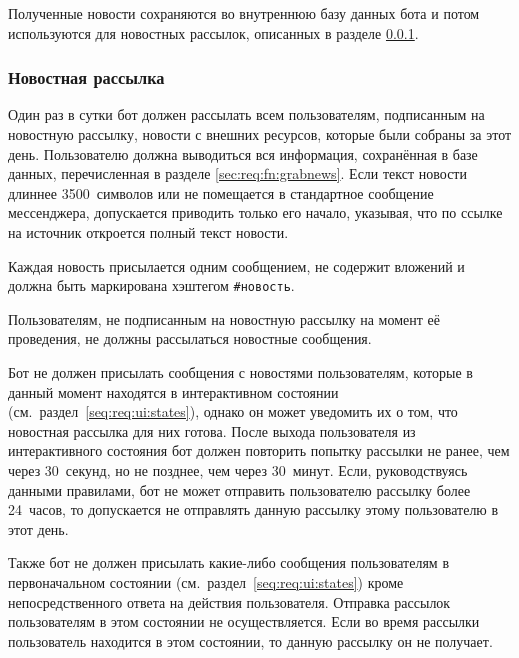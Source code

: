         Полученные новости сохраняются во внутреннюю базу данных бота и потом используются для новостных
        рассылок, описанных в разделе \ref{sec:req:fn:newsletter}.


    \subsubsection{Новостная рассылка}
        \label{sec:req:fn:newsletter}
        Один раз в сутки  бот
        должен рассылать всем пользователям, подписанным на новостную рассылку, новости с внешних
        ресурсов, которые были собраны за этот день. Пользователю
        должна выводиться вся информация, сохранённая в базе данных, перечисленная в разделе
        \ref{sec:req:fn:grabnews}. Если текст новости длиннее 3500~символов или не помещается в
        стандартное сообщение мессенджера, допускается приводить только его начало, указывая,
        что по ссылке на источник откроется полный текст новости.

        Каждая новость присылается одним сообщением, не содержит вложений и
        должна быть маркирована хэштегом \hbox{\texttt{\#новость}}.

        Пользователям, не подписанным на новостную рассылку на момент её проведения, не должны
        рассылаться новостные сообщения.

        Бот не должен присылать сообщения с новостями пользователям, которые в данный момент находятся
        в интерактивном состоянии (см.~раздел~\ref{seq:req:ui:states}),
        однако он может уведомить их о том, что новостная рассылка для них готова.
        После выхода пользователя из интерактивного состояния бот должен повторить попытку
        рассылки не ранее, чем через 30~секунд, но не позднее, чем через 30~минут.
        Если, руководствуясь данными правилами, бот не может отправить пользователю рассылку
        более 24~часов, то допускается не отправлять данную рассылку этому пользователю в этот день.

        Также бот не должен присылать какие-либо сообщения пользователям в первоначальном
        состоянии (см.~раздел~\ref{seq:req:ui:states}) кроме непосредственного ответа на действия
        пользователя. Отправка рассылок пользователям в этом состоянии не осуществляется. Если
        во время рассылки пользователь находится в этом состоянии, то данную рассылку он не получает.

